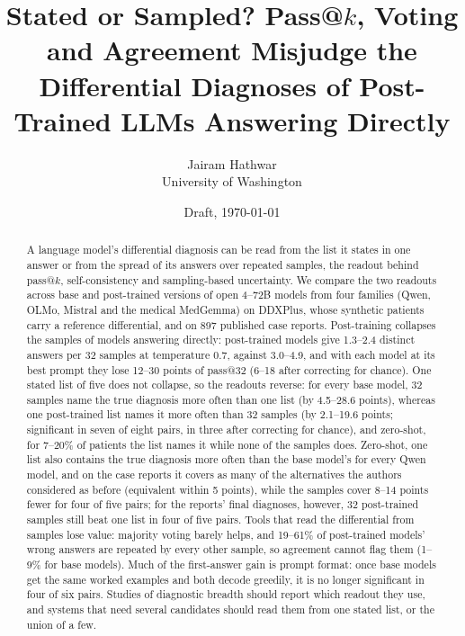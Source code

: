 \documentclass[11pt]{article}
\title{Stated or Sampled? Pass@$k$, Voting and Agreement Misjudge the\\Differential Diagnoses of Post-Trained LLMs Answering Directly}
\author{Jairam Hathwar\\University of Washington}
\date{Draft, \today}
\begin{document}
\maketitle

\begin{abstract}
A language model's differential diagnosis can be read from the list it states in one answer or from the spread of its answers over repeated samples, the readout behind pass@$k$, self-consistency and sampling-based uncertainty. We compare the two readouts across base and post-trained versions of open 4--72B models from four families (Qwen, OLMo, Mistral and the medical MedGemma) on DDXPlus, whose synthetic patients carry a reference differential, and on 897 published case reports.
Post-training collapses the samples of models answering directly: post-trained models give 1.3--2.4 distinct answers per 32 samples at temperature 0.7, against 3.0--4.9, and with each model at its best prompt they lose 12--30 points of pass@32 (6--18 after correcting for chance). One stated list of five does not collapse, so the readouts reverse: for every base model, 32 samples name the true diagnosis more often than one list (by 4.5--28.6 points), whereas one post-trained list names it more often than 32 samples (by 2.1--19.6 points; significant in seven of eight pairs, in three after correcting for chance), and zero-shot, for 7--20\% of patients the list names it while none of the samples does. Zero-shot, one list also contains the true diagnosis more often than the base model's for every Qwen model, and on the case reports it covers as many of the alternatives the authors considered as before (equivalent within 5 points), while the samples cover 8--14 points fewer for four of five pairs; for the reports' final diagnoses, however, 32 post-trained samples still beat one list in four of five pairs.
Tools that read the differential from samples lose value: majority voting barely helps, and 19--61\% of post-trained models' wrong answers are repeated by every other sample, so agreement cannot flag them (1--9\% for base models). Much of the first-answer gain is prompt format: once base models get the same worked examples and both decode greedily, it is no longer significant in four of six pairs. Studies of diagnostic breadth should report which readout they use, and systems that need several candidates should read them from one stated list, or the union of a few.
\end{abstract}

\end{document}

